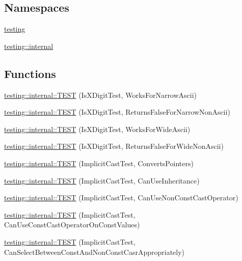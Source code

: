 \subsection*{Namespaces}
\begin{DoxyCompactItemize}
\item 
 \mbox{\hyperlink{namespacetesting}{testing}}
\item 
 \mbox{\hyperlink{namespacetesting_1_1internal}{testing\+::internal}}
\end{DoxyCompactItemize}
\subsection*{Functions}
\begin{DoxyCompactItemize}
\item 
\mbox{\hyperlink{namespacetesting_1_1internal_a0c1e055c001e4dbb874f00a46c25bb00}{testing\+::internal\+::\+T\+E\+ST}} (Is\+X\+Digit\+Test, Works\+For\+Narrow\+Ascii)
\item 
\mbox{\hyperlink{namespacetesting_1_1internal_a7cd9d67d4164d2aeb4ceb3ed253c7d2d}{testing\+::internal\+::\+T\+E\+ST}} (Is\+X\+Digit\+Test, Returns\+False\+For\+Narrow\+Non\+Ascii)
\item 
\mbox{\hyperlink{namespacetesting_1_1internal_af76bca685fddffc0ecda1464b1b6a0a4}{testing\+::internal\+::\+T\+E\+ST}} (Is\+X\+Digit\+Test, Works\+For\+Wide\+Ascii)
\item 
\mbox{\hyperlink{namespacetesting_1_1internal_a771232ed3801fa49cbd4bbe11b318fe3}{testing\+::internal\+::\+T\+E\+ST}} (Is\+X\+Digit\+Test, Returns\+False\+For\+Wide\+Non\+Ascii)
\item 
\mbox{\hyperlink{namespacetesting_1_1internal_a5d2ec1128c80363b06070f403f682490}{testing\+::internal\+::\+T\+E\+ST}} (Implicit\+Cast\+Test, Converts\+Pointers)
\item 
\mbox{\hyperlink{namespacetesting_1_1internal_a1b304dcd3ac71095f2e7d9e9b43c4755}{testing\+::internal\+::\+T\+E\+ST}} (Implicit\+Cast\+Test, Can\+Use\+Inheritance)
\item 
\mbox{\hyperlink{namespacetesting_1_1internal_a8554484c7c0ea536bc393c254490aaff}{testing\+::internal\+::\+T\+E\+ST}} (Implicit\+Cast\+Test, Can\+Use\+Non\+Const\+Cast\+Operator)
\item 
\mbox{\hyperlink{namespacetesting_1_1internal_af7f631f9fbde27b19a65d50fc29e1420}{testing\+::internal\+::\+T\+E\+ST}} (Implicit\+Cast\+Test, Can\+Use\+Const\+Cast\+Operator\+On\+Const\+Values)
\item 
\mbox{\hyperlink{namespacetesting_1_1internal_a62a3b62658f9d47733cb7b5c8f69b2ad}{testing\+::internal\+::\+T\+E\+ST}} (Implicit\+Cast\+Test, Can\+Select\+Between\+Const\+And\+Non\+Const\+Casr\+Appropriately)

\end{DoxyCompactItemize}
